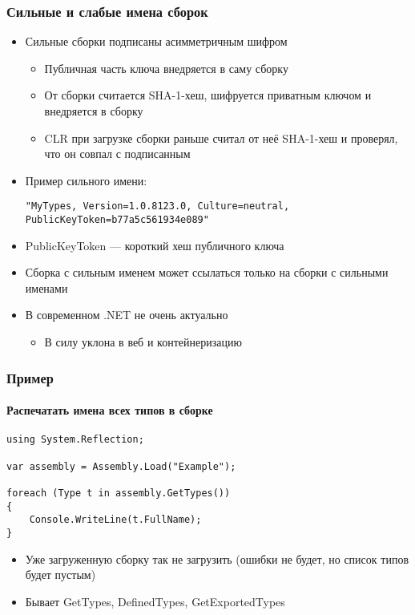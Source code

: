\documentclass{../../slides-style}
\begin{document}
    \begin{frame}[fragile]
        \frametitle{Сильные и слабые имена сборок}
        \begin{itemize}
            \item Сильные сборки подписаны асимметричным шифром
            \begin{itemize}
                \item Публичная часть ключа внедряется в саму сборку
                \item От сборки считается SHA-1-хеш, шифруется приватным ключом и внедряется в сборку
                \item CLR при загрузке сборки раньше считал от неё SHA-1-хеш и проверял, что он совпал с подписанным
            \end{itemize}
            \item Пример сильного имени:
            \begin{scriptsize}
                \begin{verbatim}
"MyTypes, Version=1.0.8123.0, Culture=neutral, PublicKeyToken=b77a5c561934e089"
                \end{verbatim}
            \end{scriptsize}
            \item PublicKeyToken --- короткий хеш публичного ключа
            \item Сборка с сильным именем может ссылаться только на сборки с сильными именами
            \item В современном .NET не очень актуально
            \begin{itemize}
                \item В силу уклона в веб и контейнеризацию
            \end{itemize}
        \end{itemize}
    \end{frame}

    \begin{frame}[fragile]
        \frametitle{Пример}
        \framesubtitle{Распечатать имена всех типов в сборке}
        \begin{verbatim}
using System.Reflection;

var assembly = Assembly.Load("Example");

foreach (Type t in assembly.GetTypes())
{
    Console.WriteLine(t.FullName);
}
        \end{verbatim}
        \begin{itemize}
            \item Уже загруженную сборку так не загрузить (ошибки не будет, но список типов будет пустым)
            \item Бывает GetTypes, DefinedTypes, GetExportedTypes
        \end{itemize}
    \end{frame}
\end{document}
